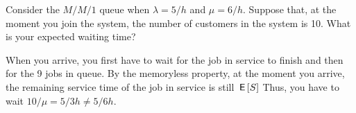 \documentclass[queueing-book.tex]{subfiles}
\begin{document}
\begin{exercise}\label{ex:44}
Consider the $M/M/1$ queue when $\lambda=5/h$ and $\mu=6/h$.
Suppose that, at the moment you join the system, the number of customers in the system is 10.
What is your expected waiting time?
\begin{solution}
When you arrive, you first have to wait for the job in service to finish and then for the 9 jobs in queue.
By the memoryless property, at the moment you arrive, the remaining service time of the job in service is still $\,\mathsf{E}\left[S\right]$ Thus, you have to wait $10/\mu = 5/3 h \neq 5/6 h$.
\end{solution}
\end{exercise}


\end{document}
